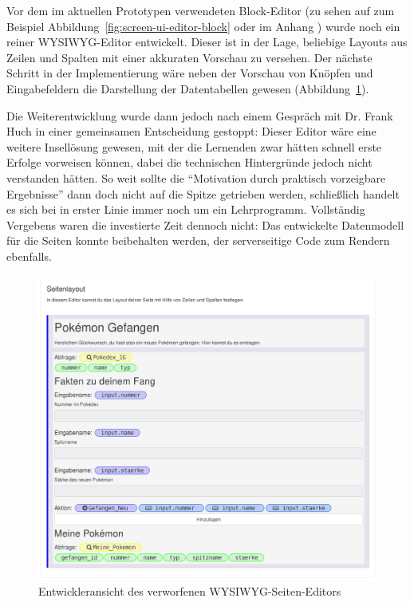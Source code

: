 Vor dem im aktuellen Prototypen verwendeten Block-Editor (zu sehen auf zum Beispiel Abbildung~\ref{fig:screen-ui-editor-block} oder im Anhang ) wurde noch ein reiner WYSIWYG-Editor entwickelt. Dieser ist in der Lage, beliebige Layouts aus Zeilen und Spalten mit einer akkuraten Vorschau zu versehen. Der nächste Schritt in der Implementierung wäre neben der Vorschau von Knöpfen und Eingabefeldern die Darstellung der Datentabellen gewesen (Abbildung~\ref{fig:discarded-wysiwyg-page-editor}).

Die Weiterentwicklung wurde dann jedoch nach einem Gespräch mit Dr. Frank Huch in einer gemeinsamen Entscheidung gestoppt: Dieser Editor wäre eine weitere Insellösung gewesen, mit der die Lernenden zwar hätten schnell erste Erfolge vorweisen können, dabei die technischen Hintergründe jedoch nicht verstanden hätten. So weit sollte die "`Motivation durch praktisch vorzeigbare Ergebnisse"' dann doch nicht auf die Spitze getrieben werden, schließlich handelt es sich bei \idename{} in erster Linie immer noch um ein Lehrprogramm. Vollständig Vergebens waren die investierte Zeit dennoch nicht: Das entwickelte Datenmodell für die Seiten konnte beibehalten werden, der serverseitige Code zum Rendern ebenfalls.

\begin{figure}[p]
  \centering \includegraphics[width=\textwidth]{images/screenshots/20160731/esqulino-editor-page-keyboard-input-partial}
  \caption{Entwickleransicht des verworfenen WYSIWYG-Seiten-Editors}
  \label{fig:discarded-wysiwyg-page-editor}
\end{figure}

